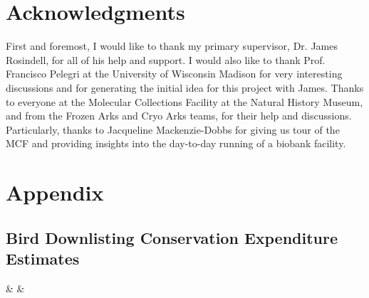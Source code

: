 \documentclass[12pt]{article}
\begin{document}
	\section{Acknowledgments}
	First and foremost, I would like to thank my primary supervisor, Dr. James
	Rosindell, for all of his help and support. I would also like to thank
	Prof. Francisco Pelegri at the University of Wisconsin Madison for very
	interesting discussions and for generating the initial idea for this
	project with James. Thanks to everyone at the Molecular Collections
	Facility at the Natural History Museum, and from the Frozen Arks and
	Cryo Arks teams, for their help and discussions. Particularly, thanks to
	Jacqueline Mackenzie-Dobbs for giving us tour of the MCF and providing
	insights into the day-to-day running of a biobank facility.
	
	\section{Appendix}
	\subsection{Bird Downlisting Conservation Expenditure Estimates}\label{expen}
	{\thecsvrow & \status & \required}%
	
	
	
\end{document}
